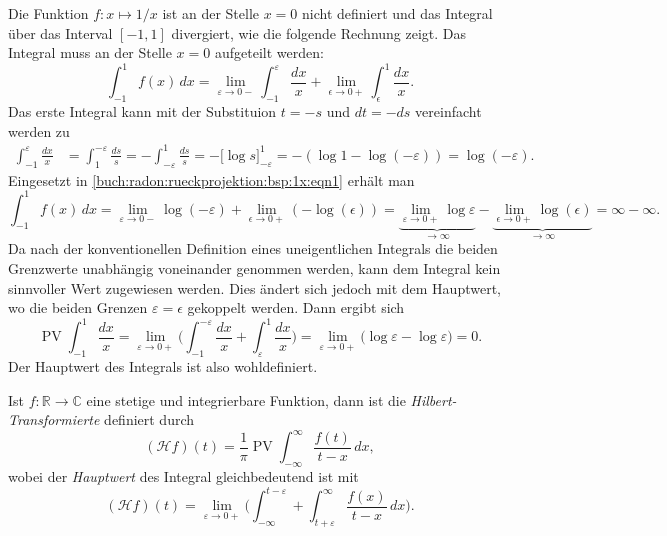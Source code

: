 \begin{beispiel}
Die Funktion $f\colon x\mapsto 1/x$ ist an der Stelle $x=0$ nicht definiert und
das Integral über das Interval $[-1,1]$ divergiert, wie die folgende Rechnung
zeigt.
Das Integral muss an der Stelle $x=0$ aufgeteilt werden:
\begin{equation}
\int_{-1}^1 f(x)\,dx
=
\lim_{\varepsilon\to 0-}
\int_{-1}^{\varepsilon} \frac{dx}{x}
+
\lim_{\epsilon\to 0+}
\int_{\epsilon}^{1} \frac{dx}{x}.
\label{buch:radon:rueckprojektion:bsp:1x:eqn1}
\end{equation}
Das erste Integral kann mit der Substituion $t=-s$ und $dt=-ds$ vereinfacht
werden zu
\begin{align*}
\int_{-1}^{\varepsilon} \frac{dx}{x}
&=
\int_{1}^{-\varepsilon} \frac{ds}{s}
=
-
\int_{-\varepsilon}^1 \frac{ds}{s}
=
-
\biggl[
\log s
\biggr]_{-\varepsilon}^1
=
-
(
\log 1 - \log(-\varepsilon)
)
=
\log(-\varepsilon).
\end{align*}
Eingesetzt in 
\eqref{buch:radon:rueckprojektion:bsp:1x:eqn1}
erhält man
\[
\int_{-1}^1 f(x)\,dx
=
\lim_{\varepsilon\to 0-}
\log(-\varepsilon)
+
\lim_{\epsilon\to 0+}
(-\log(\epsilon))
=
\underbrace{
\lim_{\varepsilon\to 0+}
\log\varepsilon
}_{\displaystyle\to \infty}
-
\underbrace{
\lim_{\epsilon\to 0+}
\log(\epsilon)
}_{\displaystyle\to \infty}
=
\infty - \infty.
\]
Da nach der konventionellen Definition eines uneigentlichen
Integrals die beiden Grenzwerte unabhängig voneinander genommen werden,
kann dem Integral kein sinnvoller Wert zugewiesen werden.
Dies ändert sich jedoch mit dem Hauptwert, wo die beiden Grenzen
$\varepsilon=\epsilon$ gekoppelt werden.
Dann ergibt sich
\[
\operatorname{PV}
\int_{-1}^1 \frac{dx}{x}
=
\lim_{\varepsilon\to 0+}
\biggl(
\int_{-1}^{-\varepsilon}\frac{dx}{x}
+
\int_{\varepsilon}^{1} \frac{dx}{x}
\biggr)
=
\lim_{\varepsilon\to 0+}
\biggl(
\log\varepsilon - \log\varepsilon
\biggr)
=
0.
\]
Der Hauptwert des Integrals ist also wohldefiniert.
\end{beispiel}

\begin{definition}
Ist $f\colon \mathbb{R}\to\mathbb{C}$ eine stetige und integrierbare
Funktion, dann ist die {\em Hilbert-Transformierte} definiert durch
\[
(\mathscr{H}f)(t)
=
\frac{1}{\pi} \operatorname{PV} \int_{-\infty}^\infty \frac{f(t)}{t-x}\,dx,
\]
wobei der {\em Hauptwert} des Integral gleichbedeutend ist mit
\[
(\mathscr{H}f)(t)
=
\lim_{\varepsilon\to 0+}
\biggl(
\int_{-\infty}^{t-\varepsilon}+\int_{t+\varepsilon}^\infty
\frac{f(x)}{t-x}\,dx
\biggr).
\]
\end{definition}

